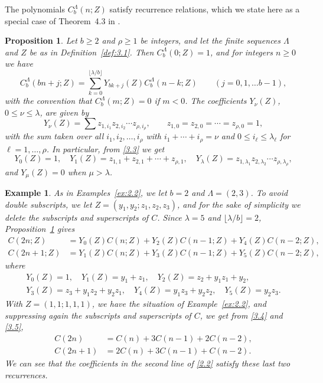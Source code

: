 \documentclass{amsart}
\theoremstyle{plain}
\newtheorem{example}[theorem]{Example}
\newtheorem{proposition}[theorem]{Proposition}
\numberwithin{equation}{section}
\begin{document}
The polynomials $C_b^\Lambda(n;Z)$ satisfy recurrence relations, which we state
here as a special case of Theorem~4.3 in \cite{DE10}.

\begin{proposition}\label{prop:3.2}
Let $b\geq 2$ and $\rho\geq 1$ be integers, and let the finite sequences
$\Lambda$ and $Z$ be as in Definition~\ref{def:3.1}. 
Then $C_b^\Lambda(0;Z)=1$, and for integers $n\geq 0$ we have
\begin{equation}\label{3.2}
C_b^\Lambda(bn+j;Z) 
= \sum_{k=0}^{\lfloor\lambda/b\rfloor}Y_{bk+j}(Z)C_b^\Lambda(n-k;Z)
\qquad (j=0, 1,\ldots b-1),
\end{equation}
with the convention that $C_b^\Lambda(m;Z)=0$ if $m<0$. The 
coefficients $Y_\nu(Z)$, $0\leq\nu\leq\lambda$, are given by 
\begin{equation}\label{3.3}
Y_\nu(Z) = \sum z_{1,i_1}z_{2,i_2}\cdots z_{\rho,i_\rho},\qquad
z_{1,0}=z_{2,0}=\cdots=z_{\rho,0}=1,
\end{equation}
with the sum taken over all $i_1,i_2,\ldots,i_\rho$ with $i_1+\cdots+i_\rho=\nu$
and $0\leq i_\ell\leq\lambda_\ell$ for $\ell=1,\ldots,\rho$. 
In particular, from \eqref{3.3} we get
\[
Y_0(Z)=1,\quad Y_1(Z)=z_{1,1}+z_{2,1}+\cdots+z_{\rho,1},\quad
Y_\lambda(Z) = z_{1,\lambda_1}z_{2,\lambda_2}\cdots z_{\rho,\lambda_\rho},
\]
and $Y_\mu(Z)=0$ when $\mu>\lambda$.
\end{proposition}

\begin{example}\label{ex:3.3}
{\rm As in Examples~\ref{ex:2.2}, we let $b=2$ and $\Lambda=(2,3)$. To avoid
double subscripts, we let $Z=(y_1,y_2;z_1,z_2,z_3)$, and for the sake of 
simplicity we delete the subscripts and superscripts of $C$. Since $\lambda=5$
and $\lfloor\lambda/b\rfloor=2$, Proposition~\ref{prop:3.2} gives}
\begin{align}
C(2n;Z) &= Y_0(Z)C(n;Z) + Y_2(Z)C(n-1;Z) +Y_4(Z)C(n-2;Z),\label{3.4}\\
C(2n+1;Z) &=  Y_1(Z)C(n;Z) + Y_3(Z)C(n-1;Z) + Y_5(Z)C(n-2;Z),\label{3.5}
\end{align}
{\rm where} 
\begin{gather*}
Y_0(Z)=1,\quad Y_1(Z)=y_1+z_1,\quad Y_2(Z)=z_2+y_1z_1+y_2,\\
Y_3(Z)=z_3+y_1z_2+y_2z_1,\quad Y_4(Z)=y_1z_3+y_2z_2, \quad Y_5(Z)=y_2z_3.
\end{gather*}
{\rm With $Z=(1,1;1,1,1)$, we have the situation of Example~\ref{ex:2.2}, and
suppressing again the subscripts and superscripts of $C$, we get from 
\eqref{3.4} and \eqref{3.5},}
\begin{align}
C(2n) &= C(n) + 3C(n-1) +2C(n-2),\label{3.6}\\
C(2n+1) &=  2C(n) + 3C(n-1) + C(n-2).\label{3.7}
\end{align}
{\rm We can see that the coefficients in the second line of \eqref{2.2} 
satisfy these last two recurrences.}
\end{example}
\end{document}
